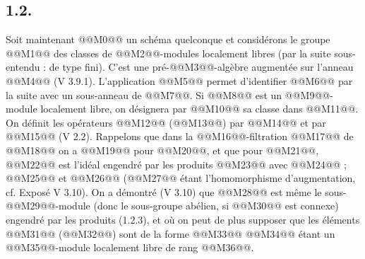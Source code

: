 
\subsection*{1.2.}
Soit maintenant @@M0@@ un schéma quelconque et considérons le groupe @@M1@@ des classes de @@M2@@-modules localement libres (par la suite sous-entendu : de type fini). C'est une pré-@@M3@@-algèbre augmentée sur l'anneau @@M4@@ (V 3.9.1). L'application @@M5@@ permet d'identifier @@M6@@ par la suite avec un sous-anneau de @@M7@@. Si @@M8@@ est un @@M9@@-module localement libre, on désignera par @@M10@@ sa classe dans @@M11@@. On définit les opérateurs @@M12@@ (@@M13@@) par
@@M14@@
et par
@@M15@@
(V 2.2). Rappelons que dans la @@M16@@-filtration @@M17@@ de @@M18@@ on a @@M19@@ pour @@M20@@, et que pour @@M21@@, @@M22@@ est l'idéal engendré par les produits
@@M23@@
avec @@M24@@ ; @@M25@@ et @@M26@@ (@@M27@@ étant l'homomorphisme d'augmentation, cf. Exposé V 3.10). On a démontré (V 3.10) que @@M28@@ est même le sous-@@M29@@-module (donc le sous-groupe abélien, si @@M30@@ est connexe) engendré par les produits (1.2.3), et où on peut de plus supposer que les éléments @@M31@@ (@@M32@@) sont de la forme
@@M33@@
@@M34@@ étant un @@M35@@-module localement libre de rang @@M36@@.


